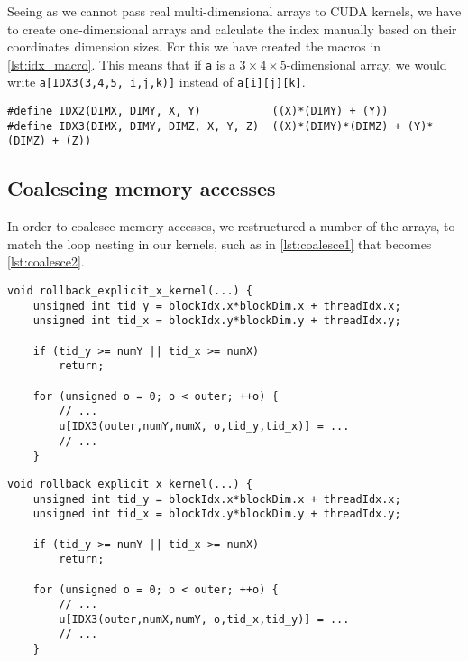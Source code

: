 \documentclass[a4paper]{article}
\begin{document}
Seeing as we cannot pass real multi-dimensional arrays to CUDA kernels, we have
to create one-dimensional arrays and calculate the index manually based on
their coordinates dimension sizes. For this we have created the macros in
\autoref{lst:idx_macro}. This means that if \texttt{a} is a $3 \times 4 \times
5$-dimensional array, we would write \verb|a[IDX3(3,4,5, i,j,k)]| instead of
\verb|a[i][j][k]|.

\begin{lstlisting}[caption={Calculating array indices.},label={lst:idx_macro}]
#define IDX2(DIMX, DIMY, X, Y)           ((X)*(DIMY) + (Y))
#define IDX3(DIMX, DIMY, DIMZ, X, Y, Z)  ((X)*(DIMY)*(DIMZ) + (Y)*(DIMZ) + (Z))
\end{lstlisting}

\subsection{Coalescing memory accesses}

In order to coalesce memory accesses, we restructured a number of the arrays,
to match the loop nesting in our kernels, such as in \autoref{lst:coalesce1}
that becomes \autoref{lst:coalesce2}.

\begin{lstlisting}[caption={\texttt{rollback}'s ``explicit x'' kernel pre-coalescing.},label={lst:coalesce1}]
void rollback_explicit_x_kernel(...) {
    unsigned int tid_y = blockIdx.x*blockDim.x + threadIdx.x;
    unsigned int tid_x = blockIdx.y*blockDim.y + threadIdx.y;

    if (tid_y >= numY || tid_x >= numX)
        return;

    for (unsigned o = 0; o < outer; ++o) {
        // ...
        u[IDX3(outer,numY,numX, o,tid_y,tid_x)] = ...
        // ...
    }
\end{lstlisting}

\begin{lstlisting}[caption={\texttt{rollback}'s ``explicit x'' kernel post-coalescing.},label={lst:coalesce2}]
void rollback_explicit_x_kernel(...) {
    unsigned int tid_y = blockIdx.x*blockDim.x + threadIdx.x;
    unsigned int tid_x = blockIdx.y*blockDim.y + threadIdx.y;

    if (tid_y >= numY || tid_x >= numX)
        return;

    for (unsigned o = 0; o < outer; ++o) {
        // ...
        u[IDX3(outer,numX,numY, o,tid_x,tid_y)] = ...
        // ...
    }
\end{lstlisting}
\end{document}
